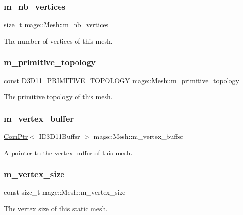 \subsubsection{\texorpdfstring{m\+\_\+nb\+\_\+vertices}{m\_nb\_vertices}}
{\footnotesize\ttfamily size\+\_\+t mage\+::\+Mesh\+::m\+\_\+nb\+\_\+vertices\hspace{0.3cm}{\ttfamily [private]}}

The number of vertices of this mesh. \hypertarget{classmage_1_1_mesh_a329fab0ad24e11b73a8981c6d09a0c7c}{}\label{classmage_1_1_mesh_a329fab0ad24e11b73a8981c6d09a0c7c} 
\subsubsection{\texorpdfstring{m\+\_\+primitive\+\_\+topology}{m\_primitive\_topology}}
{\footnotesize\ttfamily const D3\+D11\+\_\+\+P\+R\+I\+M\+I\+T\+I\+V\+E\+\_\+\+T\+O\+P\+O\+L\+O\+GY mage\+::\+Mesh\+::m\+\_\+primitive\+\_\+topology\hspace{0.3cm}{\ttfamily [private]}}

The primitive topology of this mesh. \hypertarget{classmage_1_1_mesh_af5ae74887eb330201829477cf772ba6e}{}\label{classmage_1_1_mesh_af5ae74887eb330201829477cf772ba6e} 
\subsubsection{\texorpdfstring{m\+\_\+vertex\+\_\+buffer}{m\_vertex\_buffer}}
{\footnotesize\ttfamily \hyperlink{namespacemage_ae74f374780900893caa5555d1031fd79}{Com\+Ptr}$<$ I\+D3\+D11\+Buffer $>$ mage\+::\+Mesh\+::m\+\_\+vertex\+\_\+buffer\hspace{0.3cm}{\ttfamily [protected]}}

A pointer to the vertex buffer of this mesh. \hypertarget{classmage_1_1_mesh_ab3ebdfffca054f32ac69e47c486d57b1}{}\label{classmage_1_1_mesh_ab3ebdfffca054f32ac69e47c486d57b1} 
\subsubsection{\texorpdfstring{m\+\_\+vertex\+\_\+size}{m\_vertex\_size}}
{\footnotesize\ttfamily const size\+\_\+t mage\+::\+Mesh\+::m\+\_\+vertex\+\_\+size\hspace{0.3cm}{\ttfamily [private]}}

The vertex size of this static mesh. 